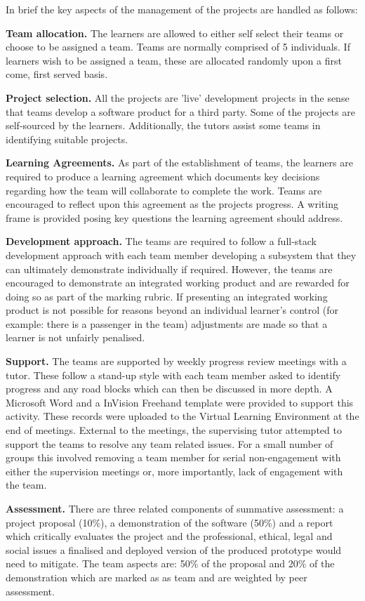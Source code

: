 \documentclass[sigconf, anonymous=true]{acmart}
\begin{document}
In brief the key aspects of the management of the projects are handled as follows:

    \textbf{Team allocation.}
The learners are allowed to either self select their teams or choose to be assigned a team. Teams are normally comprised of 5 individuals. If learners wish to be assigned a team, these are allocated randomly upon a first come, first served basis. 

\textbf {Project selection.}
All the projects are 'live' development projects in the sense that teams develop a software product for a third party. Some of the projects are self-sourced by the learners. Additionally, the tutors assist some teams in identifying suitable projects. 

\textbf{Learning Agreements.}
As part of the establishment of teams, the learners are required to produce a learning agreement which documents key decisions regarding how the team will collaborate to complete the work. Teams are encouraged to reflect upon this agreement as the projects progress. A writing frame is provided posing key questions the learning agreement should address. 

\textbf{Development approach.}
The teams are required to follow a full-stack development approach with each team member developing a subsystem that they can ultimately demonstrate individually if required. However, the teams are encouraged to demonstrate an integrated working product and are rewarded for doing so as part of the marking rubric. If presenting an integrated working product is not possible for reasons beyond an individual learner's control (for example: there is a passenger in the team) adjustments are made so that a learner is not unfairly penalised.

\textbf{Support.}
The teams are supported by weekly progress review meetings with a tutor. These  follow a stand-up style with each team member asked to identify progress and any road blocks which can then be discussed in more depth. A Microsoft Word and a InVision Freehand \cite{InVision} template were provided to support this activity. These records were uploaded to the Virtual Learning Environment at the end of meetings. External to the meetings, the supervising tutor attempted to support the teams to resolve any team related issues. For a small number of groups this involved removing a team member for serial non-engagement with either the supervision meetings or, more importantly, lack of engagement with the team.

\textbf{Assessment.}
There are three related components of summative assessment: a project proposal (10\%), a demonstration of the software (50\%) and a report which critically evaluates the project and the professional, ethical, legal and social issues a finalised and deployed version of the produced prototype would need to mitigate. The team aspects are: 50\% of the proposal and 20\% of the demonstration which are marked as as team and are weighted by peer assessment.
\end{document}
